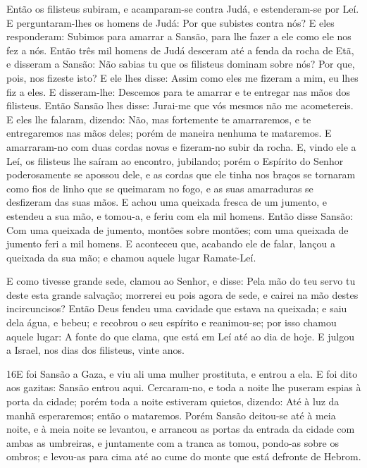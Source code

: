 Então os filisteus subiram, e acamparam-se contra Judá, e
estenderam-se por Leí. E perguntaram-lhes os homens de Judá:
Por que subistes contra nós? E eles responderam: Subimos para
amarrar a Sansão, para lhe fazer a ele como ele nos fez a nós.
Então três mil homens de Judá desceram até a fenda da rocha
de Etã, e disseram a Sansão: Não sabias tu que os filisteus dominam
sobre nós? Por que, pois, nos fizeste isto? E ele lhes disse: Assim
como eles me fizeram a mim, eu lhes fiz a eles. E
disseram-lhe: Descemos para te amarrar e te entregar nas mãos dos
filisteus. Então Sansão lhes disse: Jurai-me que vós mesmos não me
acometereis. E eles lhe falaram, dizendo: Não, mas fortemente
te amarraremos, e te entregaremos nas mãos deles; porém de maneira
nenhuma te mataremos. E amarraram-no com duas cordas novas e
fizeram-no subir da rocha. E, vindo ele a Leí, os filisteus
lhe saíram ao encontro, jubilando; porém o Espírito do Senhor
poderosamente se apossou dele, e as cordas que ele tinha nos braços
se tornaram como fios de linho que se queimaram no fogo, e as suas
amarraduras se desfizeram das suas mãos. E achou uma queixada
fresca de um jumento, e estendeu a sua mão, e tomou-a, e feriu com
ela mil homens. Então disse Sansão: Com uma queixada de
jumento, montões sobre montões; com uma queixada de jumento feri a
mil homens. E aconteceu que, acabando ele de falar, lançou a
queixada da sua mão; e chamou aquele lugar Ramate-Leí.

E como tivesse grande sede, clamou ao Senhor, e disse: Pela mão
do teu servo tu deste esta grande salvação; morrerei eu pois agora
de sede, e cairei na mão destes incircuncisos? Então Deus
fendeu uma cavidade que estava na queixada; e saiu dela água, e
bebeu; e recobrou o seu espírito e reanimou-se; por isso chamou
aquele lugar: A fonte do que clama, que está em Leí até ao dia de
hoje. E julgou a Israel, nos dias dos filisteus, vinte anos.

\medskip

\lettrine{16} E foi Sansão a Gaza, e viu ali uma mulher
prostituta, e entrou a ela. E foi dito aos gazitas: Sansão
entrou aqui. Cercaram-no, e toda a noite lhe puseram espias à porta
da cidade; porém toda a noite estiveram quietos, dizendo: Até à luz
da manhã esperaremos; então o mataremos. Porém Sansão deitou-se
até à meia noite, e à meia noite se levantou, e arrancou as portas
da entrada da cidade com ambas as umbreiras, e juntamente com a
tranca as tomou, pondo-as sobre os ombros; e levou-as para cima até
ao cume do monte que está defronte de Hebrom.

